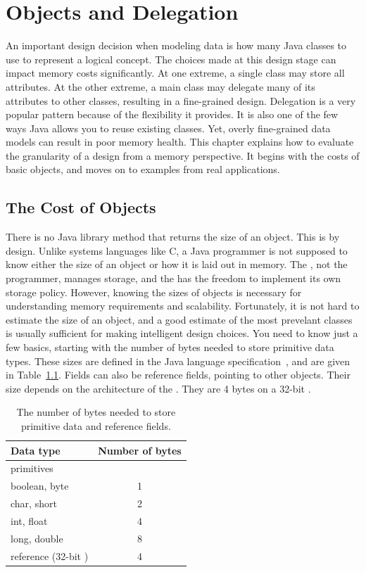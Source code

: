 \chapter{Objects and Delegation}
\label{chapter:delegation}

An important design decision when modeling data is how many Java classes to use to represent a logical concept.
The choices made at this design stage can impact memory costs significantly. At one extreme, a single class may store
all attributes. At the other extreme, a main class may delegate many of its attributes to other classes,
resulting in a fine-grained design. Delegation is a very popular pattern because of the flexibility it provides.
It is also one of the few ways Java allows you to reuse existing classes. Yet, overly fine-grained data models
can result in poor memory health. This chapter explains how to evaluate the granularity of a design from a memory perspective.
It begins with the costs of basic objects, and moves on to examples from real applications.
  
\section{The Cost of Objects}
\label{sec:CostOfObjects}

There is no Java library method that returns the size of an object. This is by
design. Unlike systems languages like C, a Java programmer is not supposed to
know either the size of an object or how it is laid out in memory. The \jre,
not the programmer, manages storage, and the \jre has the freedom to implement
its own storage policy. However, knowing the sizes of objects is necessary for understanding
memory requirements and scalability. Fortunately, it is not hard to estimate the size of an object,
and a good estimate of the most prevelant classes is usually sufficient for making intelligent design choices.
You need to know just a few basics, starting with the number of bytes needed to store primitive data types.
These sizes are defined in the Java language specification~\cite{JavaSpec}, and are given in Table~\ref{tab:primitive-sizes}.
Fields can also be reference fields, pointing to other objects. Their size
depends on the architecture of the \jre. They are 4 bytes on a 32-bit \jre.
\begin{table}
  \centering
\begin{tabular}{lc} \toprule
	Data type & Number of bytes \\ \midrule
	primitives \\ \midrule
	boolean, byte & 1 \\
	char, short & 2 \\
	int, float & 4 \\
	long, double & 8 \\ \midrule
	reference (32-bit \jre) & 4 \\
	\bottomrule
\end{tabular}
  \caption{The number of bytes needed to store primitive data and reference
  fields.}
  \label{tab:primitive-sizes}
\end{table}

